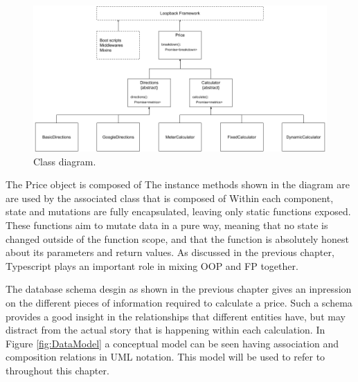 \begin{figure}[H]
	\centering
	\includegraphics[width=1\textwidth]{ClassDiagram}
	\caption[Class Diagram]{Class diagram.}
	\label{fig:ClassDiagram}
\end{figure}

The Price object is composed of
The instance methods shown in the diagram are are used by the associated class that is composed of
Within each component, state and mutations are fully encapsulated, leaving only static functions exposed. These functions aim to mutate data in a pure way, meaning that no state is changed outside of the function scope, and that the function is absolutely honest about its parameters and return values. As discussed in the previous chapter, Typescript plays an important role in mixing OOP and FP together.


The database schema desgin as shown in the previous chapter gives an inpression on the different pieces of information required to calculate a price. Such a schema provides a good insight in the relationships that different entities have, but may distract from the actual story that is happening within each calculation. In Figure \ref{fig:DataModel} a conceptual model can be seen having association and composition relations in UML notation. This model will be used to refer to throughout this chapter.

